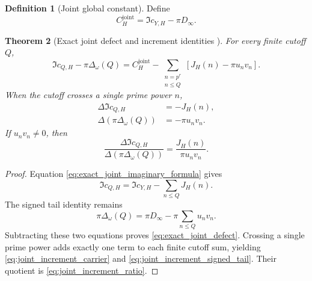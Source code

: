 \documentclass[11pt]{amsart}
\numberwithin{equation}{section}
\theoremstyle{plain}
\newtheorem{theorem}{Theorem}[section]
\theoremstyle{definition}
\newtheorem{definition}[theorem]{Definition}
\theoremstyle{remark}
\newcommand{\1}{\mathbf{1}}
\begin{document}
\begin{definition}[Joint global constant]
\label{def:joint_global_constant}
Define
\begin{equation}
C_H^{\mathrm{joint}}
=
\Im c_{Y,H}-\pi D_\infty.
\label{eq:joint_global_constant}
\end{equation}
\end{definition}


\begin{theorem}[Exact joint defect and increment identities {}]
\label{thm:exact_joint_defect_increment}
For every finite cutoff \(Q\),
\begin{equation}
\boxed{
\Im c_{Q,H}-\pi\Delta_\omega(Q)
=
C_H^{\mathrm{joint}}
-
\sum_{\substack{n=p^r\\n\leq Q}}
\left[J_H(n)-\pi u_nv_n\right].
}
\label{eq:exact_joint_defect}
\end{equation}
When the cutoff crosses a single prime power \(n\),
\begin{align}
\Delta\Im c_{Q,H}
&=
-J_H(n),
\label{eq:joint_increment_carrier}
\\
\Delta\!\left(\pi\Delta_\omega(Q)\right)
&=
-\pi u_nv_n.
\label{eq:joint_increment_signed_tail}
\end{align}
If \(u_nv_n\neq0\), then
\begin{equation}
\boxed{
\frac{
\Delta\Im c_{Q,H}
}{
\Delta(\pi\Delta_\omega(Q))
}
=
\frac{J_H(n)}{\pi u_nv_n}.
}
\label{eq:joint_increment_ratio}
\end{equation}
\end{theorem}

\begin{proof}
Equation \eqref{eq:exact_joint_imaginary_formula} gives
\begin{equation}
\Im c_{Q,H}
=
\Im c_{Y,H}-\sum_{n\leq Q}J_H(n).
\label{eq:joint_defect_first_identity}
\end{equation}
The signed tail identity remains
\begin{equation}
\pi\Delta_\omega(Q)
=
\pi D_\infty-\pi\sum_{n\leq Q}u_nv_n.
\label{eq:joint_defect_second_identity}
\end{equation}
Subtracting these two equations proves
\eqref{eq:exact_joint_defect}.  Crossing a single prime power adds exactly
one term to each finite cutoff sum, yielding
\eqref{eq:joint_increment_carrier} and
\eqref{eq:joint_increment_signed_tail}.  Their quotient is
\eqref{eq:joint_increment_ratio}.
\end{proof}
\end{document}
